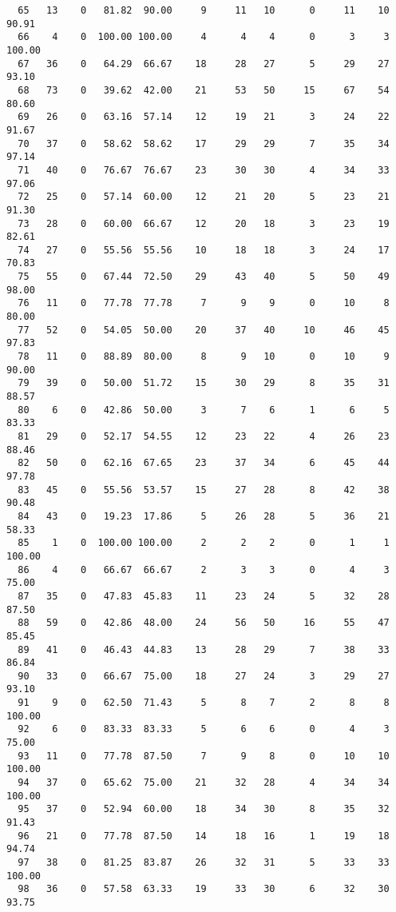 \begin{verbatim}
  65   13    0   81.82  90.00     9     11   10      0     11    10    90.91
  66    4    0  100.00 100.00     4      4    4      0      3     3   100.00
  67   36    0   64.29  66.67    18     28   27      5     29    27    93.10
  68   73    0   39.62  42.00    21     53   50     15     67    54    80.60
  69   26    0   63.16  57.14    12     19   21      3     24    22    91.67
  70   37    0   58.62  58.62    17     29   29      7     35    34    97.14
  71   40    0   76.67  76.67    23     30   30      4     34    33    97.06
  72   25    0   57.14  60.00    12     21   20      5     23    21    91.30
  73   28    0   60.00  66.67    12     20   18      3     23    19    82.61
  74   27    0   55.56  55.56    10     18   18      3     24    17    70.83
  75   55    0   67.44  72.50    29     43   40      5     50    49    98.00
  76   11    0   77.78  77.78     7      9    9      0     10     8    80.00
  77   52    0   54.05  50.00    20     37   40     10     46    45    97.83
  78   11    0   88.89  80.00     8      9   10      0     10     9    90.00
  79   39    0   50.00  51.72    15     30   29      8     35    31    88.57
  80    6    0   42.86  50.00     3      7    6      1      6     5    83.33
  81   29    0   52.17  54.55    12     23   22      4     26    23    88.46
  82   50    0   62.16  67.65    23     37   34      6     45    44    97.78
  83   45    0   55.56  53.57    15     27   28      8     42    38    90.48
  84   43    0   19.23  17.86     5     26   28      5     36    21    58.33
  85    1    0  100.00 100.00     2      2    2      0      1     1   100.00
  86    4    0   66.67  66.67     2      3    3      0      4     3    75.00
  87   35    0   47.83  45.83    11     23   24      5     32    28    87.50
  88   59    0   42.86  48.00    24     56   50     16     55    47    85.45
  89   41    0   46.43  44.83    13     28   29      7     38    33    86.84
  90   33    0   66.67  75.00    18     27   24      3     29    27    93.10
  91    9    0   62.50  71.43     5      8    7      2      8     8   100.00
  92    6    0   83.33  83.33     5      6    6      0      4     3    75.00
  93   11    0   77.78  87.50     7      9    8      0     10    10   100.00
  94   37    0   65.62  75.00    21     32   28      4     34    34   100.00
  95   37    0   52.94  60.00    18     34   30      8     35    32    91.43
  96   21    0   77.78  87.50    14     18   16      1     19    18    94.74
  97   38    0   81.25  83.87    26     32   31      5     33    33   100.00
  98   36    0   57.58  63.33    19     33   30      6     32    30    93.75

\end{verbatim}
